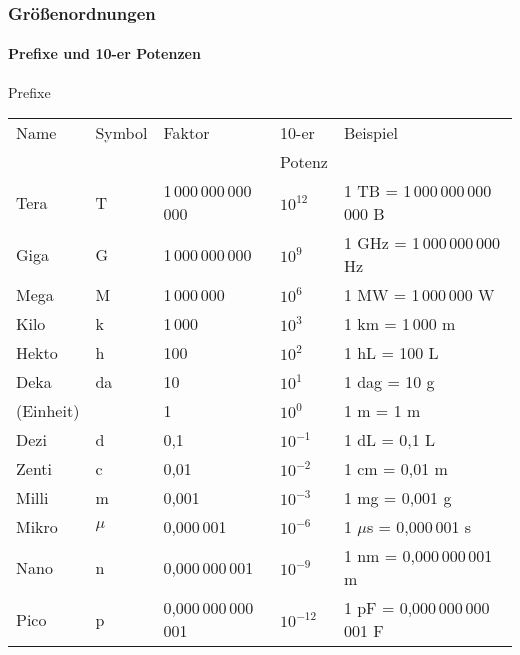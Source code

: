 \ifteacher\begin{frame}
  \frametitle{Gr\"o\ss{}enordnungen}
  \framesubtitle{Prefixe und 10-er Potenzen}
  \begin{block}{Prefixe}
    \pause 
    \begin{tabular}{@{}l*{4}{@{\,}l}@{}}
      Name     & Symbol & Faktor       & 10-er       & Beispiel \tabularnewline
      &&&                                Potenz      &  \tabularnewline\hline
      Tera     & T      & 1\,000\,000\,000\,000 & $10^{12}$ & 1 TB = 1\,000\,000\,000\,000 B \tabularnewline
      Giga     & G      & 1\,000\,000\,000 & $10^{9}$      & 1 GHz = 1\,000\,000\,000 Hz \tabularnewline
      Mega     & M      & 1\,000\,000   & $10^{6}$            & 1 MW = 1\,000\,000 W \tabularnewline
      Kilo     & k      & 1\,000       & $10^3$            & 1 km = 1\,000 m \tabularnewline
      Hekto    & h      & 100         & $10^2$            & 1 hL = 100 L \tabularnewline
      Deka     & da     & 10          & $10^1$            & 1 dag = 10 g \tabularnewline
      (Einheit)&        & 1           & $10^0$            & 1 m = 1 m \tabularnewline
      Dezi     & d      & 0,1         & $10^{-1}$         & 1 dL = 0,1 L \tabularnewline
      Zenti    & c      & 0,01        & $10^{-2}$         & 1 cm = 0,01 m \tabularnewline
      Milli    & m      & 0,001       & $10^{-3}$         & 1 mg = 0,001 g \tabularnewline
      Mikro    & $\mu$  & 0,000\,001  & $10^{-6}$         & 1 $\mu$s = 0,000\,001 s \tabularnewline
      Nano     & n      & 0,000\,000\,001& $10^{-9}$      & 1 nm = 0,000\,000\,001 m \tabularnewline
      Pico     & p      & 0,000\,000\,000\,001& $10^{-12}$& 1 pF = 0,000\,000\,000\,001 F \tabularnewline
      \hline
    \end{tabular}
  \end{block} 
\end{frame}
